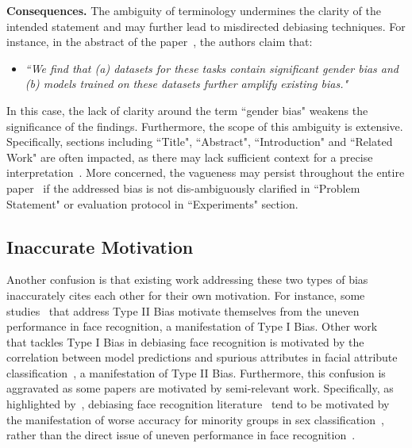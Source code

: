 


\noindent
\textbf{Consequences.}
The ambiguity of terminology undermines the clarity of the intended statement and may further lead to misdirected debiasing techniques. 
For instance, in the abstract of the paper~\cite{BA}, the authors claim that:
\begin{itemize}
    \item \emph{``We find that (a) datasets for these tasks contain significant gender bias and (b) models trained on these datasets further amplify existing bias."}~\cite{BA}
\end{itemize}
In this case, the lack of clarity around the term ``gender bias" weakens the significance of the findings. 
Furthermore, the scope of this ambiguity is extensive.
Specifically, sections including ``Title", ``Abstract", ``Introduction" and ``Related Work" are often impacted, as there may lack sufficient context for a precise interpretation~\cite{sadeghi2019global, gordaliza2019obtaining}.
More concerned, the vagueness may persist throughout the entire paper~\cite{DB_VAE_algorithmic_bias} if the addressed bias is not dis-ambiguously clarified in ``Problem Statement" or evaluation protocol in ``Experiments" section.














\subsection{Inaccurate Motivation}
Another confusion is that existing work addressing these two types of bias inaccurately cites each other for their own motivation. 
For instance, some studies~\cite{Back_MI, BlindEye_IMDB_eb} that address Type II Bias motivate themselves from the uneven performance in face recognition, a manifestation of Type I Bias. 
Other work~\cite{DeepFR_survey,FairCal} that tackles Type I Bias in debiasing face recognition is motivated by the correlation between model predictions and spurious attributes in facial attribute classification~\cite{BlindEye_IMDB_eb}, a manifestation of Type II Bias. 
Furthermore, this confusion is aggravated as some papers are motivated by semi-relevant work.
Specifically, as highlighted by~\cite{FVRT3}, debiasing face recognition literature~\cite{FairCal,RFW_IMAN,RL_RBN} tend to be motivated by the manifestation of worse accuracy for minority groups in sex classification~\cite{Timnit_sex_classification_PPB}, rather than the direct issue of uneven performance in face recognition~\cite{robinson2020face, pahl2022female}.



